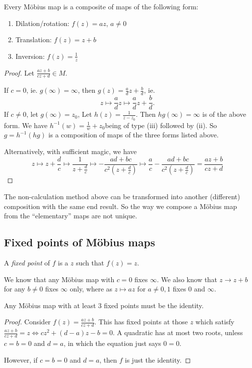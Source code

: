 \documentclass[a4paper]{article}
\begin{document}
\begin{prop}
  Every M\"obius map is a composite of maps of the following form:
  \begin{enumerate}
    \item Dilation/rotation: $f(z) = az$, $a\not= 0$
    \item Translation: $f(z) = z + b$
    \item Inversion: $f(z) = \frac{1}{z}$
  \end{enumerate}
\end{prop}
\begin{proof}
  Let $\frac{az + b}{cz + d}\in M$.

  If $c = 0$, ie. $g(\infty) = \infty$, then $g(z) = \frac{a}{d}z + \frac{b}{d}$, ie.
  \[
    z\mapsto \frac{a}{d} z\mapsto \frac{a}{d}z + \frac{b}{d}.
  \]
  If $c\not= 0$, let $g(\infty)=z_0$, Let $h(z) = \frac{1}{z - z_0}$. Then $hg(\infty) = \infty$ is of the above form. We have $h^{-1}(w) = \frac{1}{w} + z_0$being of type (iii) followed by (ii). So $g = h^{-1} (hg)$ is a composition of maps of the three forms listed above.

  Alternatively, with sufficient magic, we have
  \[
    z\mapsto z + \frac{d}{c} \mapsto \frac{1}{z + \frac{d}{c}} \mapsto -\frac{ad + bc}{c^2(z + \frac{d}{c})}\mapsto \frac{a}{c} -\frac{ad + bc}{c^2(z + \frac{d}{c})} = \frac{az + b}{cz + d}
  \]
\end{proof}
\note The non-calculation method above can be transformed into another (different) composition with the same end result. So the way we compose a M\"obius map from the ``elementary'' maps are not unique.

\subsection{Fixed points of M\"obius maps}
\begin{defi}
  A \emph{fixed point} of $f$ is a $z$ such that $f(z) = z$.
\end{defi}

We know that any M\"obius map with $c = 0$ fixes $\infty$. We also know that $z\to z + b$ for any $b\not= 0$ fixes $\infty$ only, where as $z\mapsto az$ for $a\not= 0, 1$ fixes $0$ and $\infty$.

\begin{prop}
  Any M\"obius map with at least 3 fixed points must be the identity.
\end{prop}

\begin{proof}
  Consider $f(z) = \frac{az + b}{cz + d}$. This has fixed points at those $z$ which satisfy $\frac{az + b}{cz + d} = z \Leftrightarrow cz^2 + (d - a)z - b = 0$. A quadratic has at most two roots, unless $c = b = 0$ and $d = a$, in which the equation just says $0 = 0$.

  However, if $c = b= 0$ and $d = a$, then $f$ is just the identity.
\end{proof}
\end{document}
